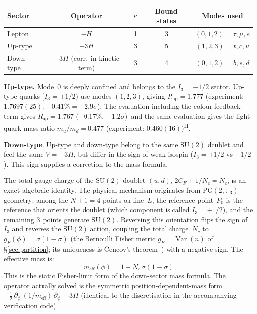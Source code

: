 \documentclass[12pt,a4paper]{article}
\newcommand{\PII}{\textsuperscript{\textup{II}}}
\begin{document}
\begin{center}\small
\begin{tabular}{lcccc}
\toprule
Sector & Operator & $\kappa$ & Bound states & Modes used \\
\midrule
Lepton & $-H$  & 1 & 3 & $(0,1,2) = \tau,\mu,e$ \\
Up-type & $-3H$ & 3 & 5 & $(1,2,3) = t,c,u$ \\
Down-type & $-3H$ (corr.\ in kinetic term) & 3 & 4 & $(0,1,2) = b,s,d$ \\
\bottomrule
\end{tabular}
\end{center}

\noindent\textbf{Up-type.}\;
Mode~0 is deeply confined and belongs to the $I_3 = -1/2$ sector.
Up-type quarks ($I_3 = +1/2$) use modes $(1,2,3)$, giving
$R_\mathrm{up} = 1.777$ (experiment: $1.7697(25)$, $+0.41\% = +2.9\sigma$).
The evaluation including the colour feedback term gives
$R_\mathrm{up} = 1.767$ ($-0.17\%$, $-1.2\sigma$), and the same evaluation gives the
light-quark mass ratio $m_u/m_d = 0.477$ (experiment: $0.460(16)$)\PII{}.

\noindent\textbf{Down-type.}\;
Up-type and down-type belong to the same $\mathrm{SU}(2)$
doublet and feel the same $V = -3H$, but differ in the sign of
weak isospin ($I_3 = +1/2$ vs $-1/2$).
This sign supplies a correction to the mass formula.

The total gauge charge of the $\mathrm{SU}(2)$ doublet $(u, d)$, $2C_F + 1/N_c = N_c$, is an exact algebraic identity.
The physical mechanism originates from
$\mathrm{PG}(2,\mathbb{F}_3)$ geometry: among the $N{+}1 = 4$ points on
line~$L$, the reference point~$P_0$ is the reference that orients the
doublet (which component is called $I_3 = +1/2$), and the
remaining 3~points generate $\mathrm{SU}(2)$. Reversing this
orientation flips the sign of $I_3$ and reverses the $\mathrm{SU}(2)$
action, coupling the total charge~$N_c$ to $g_F(\phi) = \sigma(1{-}\sigma)$
(the Bernoulli Fisher metric $g_F = \operatorname{Var}(n)$ of \S\ref{sec:partition}; its uniqueness is \v{C}encov's theorem~\cite{cencov}) with
a negative sign.
The effective mass is:
\begin{equation}
  m_\mathrm{eff}(\phi) = 1 - N_c\,\sigma(1{-}\sigma)
\end{equation}
This is the static Fisher-limit form of the down-sector mass formula. The operator actually solved is the symmetric position-dependent-mass form $-\tfrac{1}{2}\,\partial_\phi\,(1/m_\mathrm{eff})\,\partial_\phi - 3H$ (identical to the discretisation in the accompanying verification code).
\end{document}
